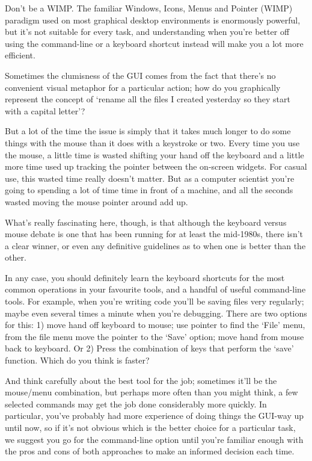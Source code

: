 \begin{diversion}{Don't be a WIMP.}
The familiar Windows, Icons, Menus and Pointer (WIMP) paradigm used on most graphical desktop environments is enormously powerful, but it's not suitable for every task, and understanding when you're better off using the command-line or a keyboard shortcut instead will make you a lot more efficient.

Sometimes the clumisness of the GUI comes from the fact that there's no convenient visual metaphor for a particular action; how do you graphically represent the concept of `rename all the files I created yesterday so they start with a capital letter'? 

But a lot of the time the issue is simply that it takes much longer to do some things with the mouse than it does with a keystroke or two. Every time you use the mouse, a little time is wasted shifting your hand off the keyboard and a little more time used up tracking the pointer between the on-screen widgets. For casual use, this wasted time really doesn't matter. But as a computer scientist you're going to spending a lot of time time in front of a machine, and all the seconds wasted moving the mouse pointer around add up. 

What's really fascinating here, though, is that although the keyboard versus mouse debate is one that has been running for at least the mid-1980s, there isn't a clear winner, or even any definitive guidelines as to when one is better than the other. 

In any case, you should definitely learn the keyboard shortcuts for the most common operations in your favourite tools, and a handful of useful command-line tools. For example, when you're writing code you'll be saving files very regularly; maybe even several times a minute when you're debugging. There are two options for this: 1) move hand off keyboard to mouse; use pointer to find the `File' menu, from the file menu move the pointer to the `Save' option; move hand from mouse back to keyboard. Or 2) Press the combination of keys that perform the `save' function. Which do you think is faster?

And think carefully about the best tool for the job; sometimes it'll be the mouse/menu combination, but perhaps more often than you might think, a few selected commands may get the job done considerably more quickly. In particular, you've probably had more experience of doing things the GUI-way up until now, so if it's not obvious which is the better choice for a particular task, we suggest you go for the command-line option until you're familiar enough with the pros and cons of both approaches to make an informed decision each time.
\end{diversion}

